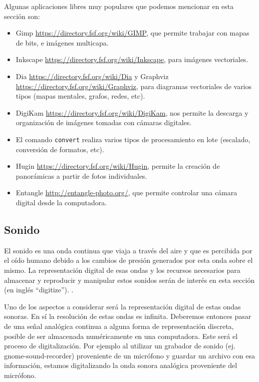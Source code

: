 \documentclass[12pt]{article}
\begin{document}
Algunas aplicaciones libres muy populares que podemos mencionar en esta sección son: 
\begin{itemize}
\item Gimp \url{https://directory.fsf.org/wiki/GIMP}, que permite 
trabajar con mapas de bits, e imágenes multicapa. 
\item Inkscape \url{https://directory.fsf.org/wiki/Inkscape}, 
para imágenes vectoriales. 
\item Dia \url{https://directory.fsf.org/wiki/Dia} y Graphviz 
\url{https://directory.fsf.org/wiki/Graphviz}, para diagramas vectoriales de 
varios tipos (mapas mentales, grafos, redes, etc). 
\item DigiKam \url{https://directory.fsf.org/wiki/DigiKam}, nos permite la descarga y organización de 
imágenes tomadas con cámaras digitales. 
\item El comando {\tt convert} realiza varios tipos de procesamiento
en lote (escalado, conversión de formatos, etc). 
\item Hugin \url{https://directory.fsf.org/wiki/Hugin},  
permite la creación de panorámicas a partir de fotos individuales.  
\item Entangle \url{http://entangle-photo.org/}, que permite controlar una cámara 
digital desde la computadora.
\end{itemize}


 
\subsection*{Sonido}

El sonido es una onda continua que viaja a través del aire y que es percibida por el 
oído humano debido a los cambios de presión generados por esta onda sobre el mismo. 
La representación digital de esas ondas y los recursos necesarios para almacenar y 
reproducir y manipular estos sonidos serán de interés en esta sección (en inglés ``digitize''). . 

Uno de los aspectos a considerar será la representación digital de estas ondas sonoras.
En sí la resolución de estas ondas es infinita. Deberemos entonces pasar de una 
señal analógica continua a alguna forma de representación discreta, posible de ser  
almacenada numéricamente en una computadora. Este será el proceso de digitalización. 
Por ejemplo al utilizar un grabador de sonido (ej. gnome-sound-recorder) proveniente 
de un micrófono y guardar un archivo con esa información, estamos digitalizando la 
onda sonora analógica proveniente del micrófono. 
\end{document}
